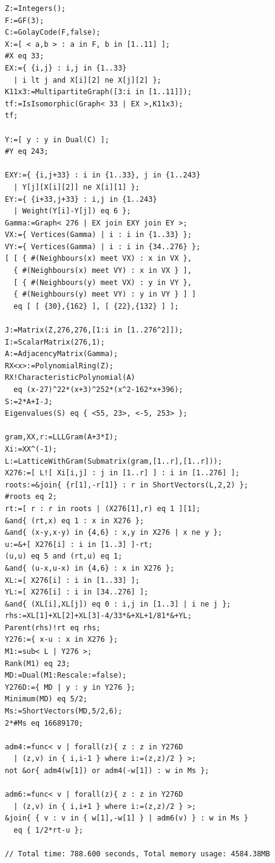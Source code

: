 \documentclass[12pt]{article}
\theoremstyle{definition}
\begin{document}
\begin{verbatim}
Z:=Integers();
F:=GF(3);
C:=GolayCode(F,false);
X:=[ < a,b > : a in F, b in [1..11] ];
#X eq 33;
EX:={ {i,j} : i,j in {1..33} 
  | i lt j and X[i][2] ne X[j][2] };
K11x3:=MultipartiteGraph([3:i in [1..11]]);
tf:=IsIsomorphic(Graph< 33 | EX >,K11x3);
tf;

Y:=[ y : y in Dual(C) ];
#Y eq 243;

EXY:={ {i,j+33} : i in {1..33}, j in {1..243} 
  | Y[j][X[i][2]] ne X[i][1] };
EY:={ {i+33,j+33} : i,j in {1..243} 
  | Weight(Y[i]-Y[j]) eq 6 };
Gamma:=Graph< 276 | EX join EXY join EY >;
VX:={ Vertices(Gamma) | i : i in {1..33} };
VY:={ Vertices(Gamma) | i : i in {34..276} };
[ [ { #(Neighbours(x) meet VX) : x in VX },
  { #(Neighbours(x) meet VY) : x in VX } ],
  [ { #(Neighbours(y) meet VX) : y in VY },
  { #(Neighbours(y) meet VY) : y in VY } ] ]
  eq [ [ {30},{162} ], [ {22},{132} ] ];

J:=Matrix(Z,276,276,[1:i in [1..276^2]]);
I:=ScalarMatrix(276,1);
A:=AdjacencyMatrix(Gamma);
RX<x>:=PolynomialRing(Z);
RX!CharacteristicPolynomial(A)
  eq (x-27)^22*(x+3)^252*(x^2-162*x+396);
S:=2*A+I-J;
Eigenvalues(S) eq { <55, 23>, <-5, 253> };

gram,XX,r:=LLLGram(A+3*I);
Xi:=XX^(-1);
L:=LatticeWithGram(Submatrix(gram,[1..r],[1..r]));
X276:=[ L![ Xi[i,j] : j in [1..r] ] : i in [1..276] ];
roots:=&join{ {r[1],-r[1]} : r in ShortVectors(L,2,2) };
#roots eq 2;
rt:=[ r : r in roots | (X276[1],r) eq 1 ][1];
&and{ (rt,x) eq 1 : x in X276 };
&and{ (x-y,x-y) in {4,6} : x,y in X276 | x ne y };
u:=&+[ X276[i] : i in [1..3] ]-rt;
(u,u) eq 5 and (rt,u) eq 1;
&and{ (u-x,u-x) in {4,6} : x in X276 };
XL:=[ X276[i] : i in [1..33] ];
YL:=[ X276[i] : i in [34..276] ];
&and{ (XL[i],XL[j]) eq 0 : i,j in [1..3] | i ne j };
rhs:=XL[1]+XL[2]+XL[3]-4/33*&+XL+1/81*&+YL;
Parent(rhs)!rt eq rhs;
Y276:={ x-u : x in X276 };
M1:=sub< L | Y276 >;
Rank(M1) eq 23;
MD:=Dual(M1:Rescale:=false);
Y276D:={ MD | y : y in Y276 };
Minimum(MD) eq 5/2;
Ms:=ShortVectors(MD,5/2,6);
2*#Ms eq 16689170;

adm4:=func< v | forall(z){ z : z in Y276D 
  | (z,v) in { i,i-1 } where i:=(z,z)/2 } >;
not &or{ adm4(w[1]) or adm4(-w[1]) : w in Ms };

adm6:=func< v | forall(z){ z : z in Y276D 
  | (z,v) in { i,i+1 } where i:=(z,z)/2 } >;
&join{ { v : v in { w[1],-w[1] } | adm6(v) } : w in Ms } 
  eq { 1/2*rt-u };

// Total time: 788.600 seconds, Total memory usage: 4584.38MB
\end{verbatim}
\end{document}
